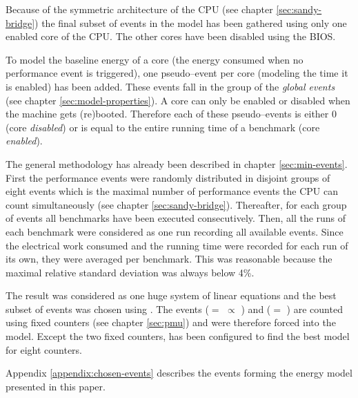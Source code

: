 Because of the symmetric architecture of the CPU (see chapter
\ref{sec:sandy-bridge}) the final subset of events in the model has been
gathered using only one enabled core of the CPU. The other cores have been
disabled using the BIOS.

To model the baseline energy of a core (the energy consumed when no performance
event is triggered), one pseudo--event per core (modeling the time it is
enabled) has been added. These events fall in the group of the \emph{global
events} (see chapter \ref{sec:model-properties}). A core can only be enabled or
disabled when the machine gets (re)booted. Therefore each of these
pseudo--events is either $0$ (core \emph{disabled}) or is equal to the entire
running time of a benchmark (core \emph{enabled}).

The general methodology has already been described in chapter
\ref{sec:min-events}.  First the performance events were randomly distributed in
disjoint groups of eight events which is the maximal number of performance
events the CPU can count simultaneously (see chapter \ref{sec:sandy-bridge}).
Thereafter, for each group of events all benchmarks have been executed
consecutively. Then, all the runs of each benchmark were considered as one run
recording all available events. Since the electrical work consumed and the
running time were recorded for each run of its own, they were averaged per
benchmark. This was reasonable because the maximal relative standard deviation
was always below 4\%.

The result was considered as one huge system of linear equations and the best
subset of events was chosen using \JWTleaps{}. The events \JWctrCLK{} ($=$
 $\propto$
) and \JWctrINST{} ($=$
) are counted using fixed counters (see chapter
\ref{sec:pmu}) and were therefore forced into the model. Except the two fixed
counters, \JWTleaps{} has been configured to find the best model for eight
counters.

Appendix \ref{appendix:chosen-events} describes the events forming the energy
model presented in this paper.


\label{sec:final-model}

